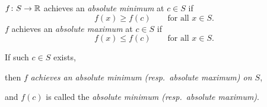 \documentclass[10pt,aspectratio=169]{beamer}
\begin{document}
\begin{frame}
$f \colon S \to {\mathbb{R}}$ achieves an
\emph{absolute minimum} at $c \in S$ if
\begin{equation*}
f(x) \geq f(c) \qquad \text{for all } x \in S.
\end{equation*}
\pause
$f$ achieves an 
\emph{absolute maximum} at $c \in S$ if
\begin{equation*}
f(x) \leq f(c) \qquad \text{for all } x \in S.
\end{equation*}

\pause
If such $c \in S$ exists,

then 
$f$ \emph{achieves an absolute minimum (resp.\ absolute maximum) on
$S$},

and $f(c)$ is called the \emph{absolute minimum (resp.\ absolute maximum)}.

\pause
\medskip

\begin{center}
\end{center}
\end{frame}
\end{document}
